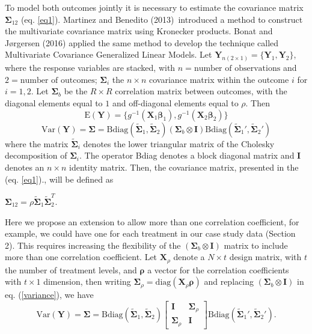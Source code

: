 \documentclass[useAMS,referee]{biom}
\begin{document}
To model both outcomes jointly it is necessary to estimate the covariance matrix $\boldsymbol{\Sigma}_{12}$ (eq. \ref{eq1}). Martinez and Benedito (2013)~\nocite{martinez2013general}introduced a method to construct the multivariate covariance matrix using Kronecker products. Bonat and J{\o}rgersen (2016) applied the same method to develop the technique called Multivariate Covariance Generalized Linear Models.
Let $\mathbf{Y}_{n(2 \times 1)} = \{\mathbf{Y}_1,\mathbf{Y}_2\} $, where the response variables are stacked, with $n = \mbox{number of observations}$ and $2 = \mbox{number of outcomes}$; $\boldsymbol{\Sigma}_i$ the $n \times n$ covariance matrix within the outcome $i$ for $i = 1,2$. Let $\boldsymbol{\Sigma}_b$ be the $R \times R$ correlation matrix between outcomes, with the diagonal elements equal to $1$ and off-diagonal elements equal to $\rho$. 
Then 
\begin{equation*}
\mbox{E}(\mathbf{Y})	 = \{g^{-1}(\mathbf{X}_1 \boldsymbol{\beta}_1), g^{-1}(\mathbf{X}_2 \boldsymbol{\beta}_2)\} 
\end{equation*}
\begin{equation}\label{variance}	
\mbox{Var}(\mathbf{Y})=\boldsymbol{\Sigma}= \mbox{Bdiag}(\tilde{\boldsymbol{\Sigma}}_1, \tilde{\boldsymbol{\Sigma}}_2)(\boldsymbol{\Sigma}_b \otimes \mathbf{I} )\mbox{Bdiag}(\tilde{\boldsymbol{\Sigma}}_1',  \boldsymbol{\tilde{\Sigma}}_2')
\end{equation}
where the matrix $\boldsymbol{\tilde{\Sigma}}_i$ denotes the lower triangular matrix of the Cholesky decomposition of $\boldsymbol{\Sigma}_i$. The operator Bdiag denotes a block diagonal matrix and $\mathbf{I}$ denotes an $n \times n$ identity matrix. Then, the covariance matrix, presented in the (eq. \ref{eq1})., will be defined as 

\begin{center}
$\boldsymbol{\Sigma}_{12} = \rho  \tilde{\boldsymbol{\Sigma}}_{1} \tilde{\boldsymbol{\Sigma}}_{2}^{T} $.
\end{center}
Here we propose an extension to allow more than one correlation coefficient, for example, we could have one for each treatment in our case study data (Section 2). This requires increasing the flexibility of the $(\boldsymbol{\Sigma}_b\otimes \mathbf{I})$ matrix to include more than one correlation coefficient.   
Let $\mathbf{X}_\rho$ denote a $N \times t$ design matrix, with $t$ the number of treatment levels, and $\boldsymbol{\rho}$ a vector for the correlation coefficients  with $t \times 1$ dimension, then writing $\boldsymbol{\Sigma}_\rho=	\mbox{diag}(\mathbf{X}_\rho \boldsymbol{\rho})$ and replacing $(\boldsymbol{\Sigma}_b\otimes \mathbf{I})$ in eq. (\ref{variance}), we have
\begin{equation*}	
\mbox{Var}(\mathbf{Y})=\boldsymbol{\Sigma}= \mbox{Bdiag}(\tilde{\boldsymbol{\Sigma}}_1, \tilde{\boldsymbol{\Sigma}}_2)
\left[\begin{array}{cc}
\mathbf{I} & \boldsymbol{\Sigma}_\rho\\
\boldsymbol{\Sigma}_\rho & \mathbf{I} \end{array} \right]
\mbox{Bdiag}(\tilde{\boldsymbol{\Sigma}}_1', \boldsymbol{\tilde{\Sigma}}_2').
\end{equation*}
\end{document}
